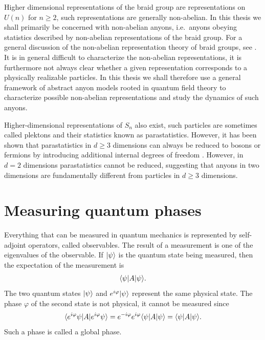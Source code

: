\documentclass[a4paper,10pt,oneside]{book}
\theoremstyle{plain}
\theoremstyle{definition}
\theoremstyle{remark}
\DeclarePairedDelimiter\bra{\langle}{\rvert}
\DeclarePairedDelimiter\ket{\lvert}{\rangle}
\begin{document}
Higher dimensional representations of the braid group are representations on $U(n)$ for $n \ge 2$, such representations are generally non-abelian. In this thesis we shall primarily be concerned with non-abelian anyons, i.e.\ anyons obeying statistics described by non-abelian representations of the braid group. For a general discussion of the non-abelian representation theory of braid groups, see \cite{oskar}. It is in general difficult to characterize the non-abelian representations, it is furthermore not always clear whether a given representation corresponds to a physically realizable particles. In this thesis we shall therefore use a general framework of abstract anyon models rooted in quantum field theory to characterize possible non-abelian representations and study the dynamics of such anyons.

Higher-dimensional representations of $S_n$ also exist, such particles are sometimes called plektons and their statistics known as parastatistics. However, it has been shown that parastatistics in $d \ge 3$ dimensions can always be reduced to bosons or fermions by introducing additional internal degrees of freedom \cite{fröhlich}. However, in $d = 2$ dimensions parastatistics cannot be reduced, suggesting that anyons in two dimensions are fundamentally different from particles in $d \ge 3$ dimensions.


\section{Measuring quantum phases}\label{sec:global vs relative phase}

Everything that can be measured in quantum mechanics is represented by self-adjoint operators, called observables. The result of a measurement is one of the eigenvalues of the observable. If $\ket{\psi}$ is the quantum state being measured, then the expectation of the measurement is
\begin{equation}
  \bra{\psi}A\ket{\psi}.
\end{equation}
The two quantum states $\ket{\psi}$ and $e^{i\varphi}\ket{\psi}$ represent the same physical state. The phase $\varphi$ of the second state is not physical, it cannot be measured since
\begin{equation}
  \bra{e^{i\varphi}\psi}A\ket{e^{i\varphi}\psi}
  = e^{-i\varphi}e^{i\varphi} \bra{\psi}A\ket{\psi}
  = \bra{\psi}A\ket{\psi}.
\end{equation}
Such a phase is called a global phase.
\end{document}
